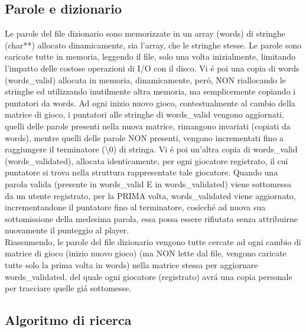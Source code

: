\subsection{Parole e dizionario}

Le parole del file dizionario sono memorizzate in un array (words) di stringhe (char**) allocato dinamicamente, sia l'array, che le stringhe stesse. Le parole sono caricate tutte in memoria, leggendo il file, solo una volta inizialmente, limitando l'impatto delle costose operazioni di I/O con il disco. Vi \'e poi una copia di words (words\_valid) allocata in memoria, dinamicamente, per\'o, NON riallocando le stringhe ed utilizzando inutilmente altra memoria, ma semplicemente copiando i puntatori da words. Ad ogni inizio nuovo gioco, contestualmente al cambio della matrice di gioco, i puntatori alle stringhe di words\_valid vengono aggiornati, quelli delle parole presenti nella nuova matrice, rimangono invariati (copiati da words), mentre quelli delle parole NON presenti, vengono incrementati fino a raggiungere il terminatore (\textbackslash0) di stringa. Vi \'e poi un'altra copia di words\_valid (words\_validated), allocata identicamente, per ogni giocatore registrato, il cui puntatore si trova nella struttura rappresentate tale giocatore. Quando una parola valida (presente in words\_valid E in words\_validated) viene sottomessa da un utente registrato, per la PRIMA volta, words\_validated viene aggiornato, incrementandone il puntatore fino al terminatore, cos\'icch\'e ad nuova sua sottomissione della medesima parola, essa possa essere rifiutata senza attribuirne nuovamente il punteggio al player.
\\
Riassumendo, le parole del file dizionario vengono tutte cercate ad ogni cambio di matrice di gioco (inizio nuovo gioco) (ma NON lette dal file, vengono caricate tutte solo la prima volta in words) nella matrice stessa per aggiornare words\_validated, del quale ogni giocatore (registrato) avr\'a una copia personale per tracciare quelle gi\'a sottomesse. 
\\

\subsection{Algoritmo di ricerca}

